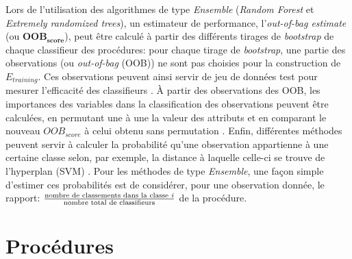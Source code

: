 	Lors de l'utilisation des algorithmes de type \textit{Ensemble} (\textit{Random Forest} et \textit{Extremely randomized trees}), un estimateur de performance, l'\textit{out-of-bag estimate} (ou $\mathbf{OOB_{score}}$), peut être calculé à partir des différents tirages de \textit{bootstrap} de chaque classifieur des procédures: pour chaque tirage de \textit{bootstrap}, une partie des observations (ou \textit{out-of-bag} (OOB)) ne sont pas choisies pour la construction de $E_{training}$. Ces observations peuvent ainsi servir de jeu de données test pour mesurer l'efficacité des classifieurs \cite[p.507]{izenman2008modern}. À partir des observations des OOB,  les importances des variables dans la classification des observations peuvent être calculées, en permutant une à une la valeur des attributs et en comparant le nouveau $OOB_{score}$ à celui obtenu sans permutation \citep{Breiman2001}\cite[p.543]{izenman2008modern}. Enfin, différentes méthodes peuvent servir à calculer la probabilité qu'une observation appartienne à une certaine classe selon, par exemple, la distance à laquelle celle-ci se trouve de l'hyperplan (SVM) \citep{ruping2004simple}. Pour les méthodes de type \textit{Ensemble}, une façon simple d'estimer ces probabilités est de considérer, pour une observation donnée, le rapport: $\frac{\textrm{nombre de classements dans la classe \textit{i}}}{\textrm{nombre total de classifieurs}}$ de la procédure. 



\section{Procédures}\label{parprotocclassif}
